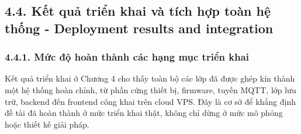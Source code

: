 \documentclass[a4paper]{extarticle}
\begin{document}
\subsection{4.4. Kết quả triển khai và tích hợp toàn hệ thống - Deployment results and integration}\label{kux1ebft-quux1ea3-triux1ec3n-khai-vuxe0-tuxedch-hux1ee3p-touxe0n-hux1ec7-thux1ed1ng---deployment-results-and-integration}

\subsubsection{4.4.1. Mức độ hoàn thành các hạng mục triển khai}\label{mux1ee9c-ux111ux1ed9-houxe0n-thuxe0nh-cuxe1c-hux1ea1ng-mux1ee5c-triux1ec3n-khai}

Kết quả triển khai ở Chương 4 cho thấy toàn bộ các lớp đã được ghép kín thành một
hệ thống hoàn chỉnh, từ phần cứng thiết bị, firmware, tuyến MQTT, lớp lưu trữ,
backend đến frontend công khai trên cloud VPS. Đây là cơ sở để khẳng định đề tài
đã hoàn thành ở mức triển khai thật, không chỉ dừng ở mức mô phỏng hoặc thiết kế
giải pháp.
\end{document}
